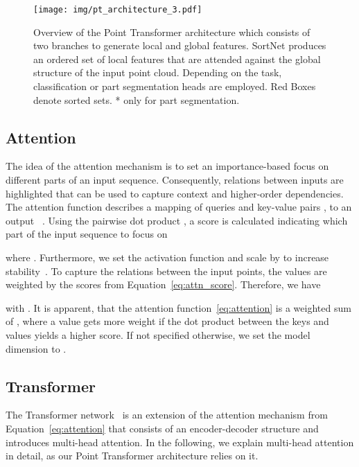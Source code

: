 \documentclass{ieeeaccess}
\begin{document}
\begin{figure*}[t]
\begin{center}
\texttt{[image: img/pt\_architecture\_3.pdf]}
\end{center}
\caption{Overview of the Point Transformer architecture which consists of two branches to generate local and global features. SortNet produces an ordered set of local features that are attended against the global structure of the input point cloud. Depending on the task, classification or part segmentation heads are employed.  Red Boxes denote sorted sets. * only for part segmentation.}
    \label{fig:point-transformer}
\end{figure*}

\subsection{Attention}
The idea of the attention mechanism is to set an importance-based focus on different parts of an input sequence. Consequently, relations between inputs are highlighted that can be used to capture context and higher-order dependencies. 
 The attention function  describes a mapping of  queries  and  key-value pairs \mbox{,} \mbox{} to an output ~\cite{vaswani2017attention}. 
Using the pairwise dot product , a score is calculated indicating  which part of the input sequence to focus on

where . Furthermore, we set the activation function  and scale  by  to increase stability~\cite{vaswani2017attention}. 
To capture the relations between the input points, the values  are weighted by the scores from Equation~\eqref{eq:attn_score}. Therefore, we have

with . It is apparent, that the attention function~\eqref{eq:attention} is a weighted sum of , where a value gets more weight if the dot product between the keys and values yields a higher score. 
If not specified otherwise, we set the model dimension to \mbox{.}



\subsection{Transformer}\label{seq:transformer}
The Transformer network~\cite{vaswani2017attention} is an extension of the attention mechanism from Equation~\eqref{eq:attention} that consists of an encoder-decoder structure and introduces multi-head attention. In the following, we explain multi-head attention in detail, as our Point Transformer architecture relies on it.
\end{document}
